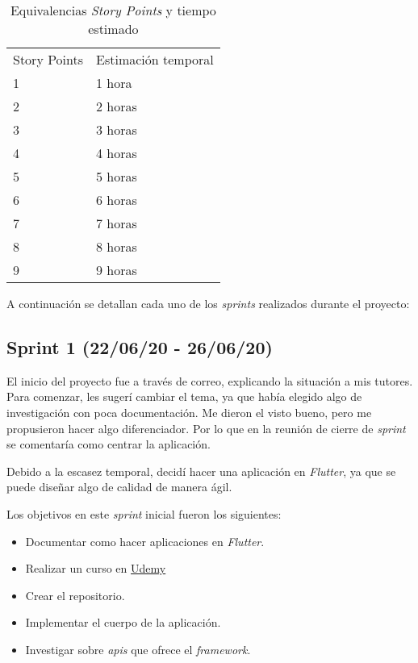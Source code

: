 \begin{table}[H]
	\centering
	\begin{tabular}{l l }
		\toprule
		{Story Points} & Estimación temporal \\
		1            & 1 hora              \\ 
		2            & 2 horas           \\ 
		3            & 3 horas             \\ 
		4            & 4 horas           \\ 
		5            & 5 horas             \\ 
		6            & 6 horas           \\ 
		7            & 7 horas             \\ 
		8            & 8 horas             \\ 
		9            & 9 horas             \\ \bottomrule
	\end{tabular}
	\caption{Equivalencias \emph{Story Points} y tiempo estimado}
	\label{tabla:storypoint}
\end{table}

A continuación se detallan cada uno de los \emph{sprints} realizados durante el proyecto:

\subsection{Sprint 1 (22/06/20 - 26/06/20)}\label{sprint-2-220620---260620}

El inicio del proyecto fue a través de correo, explicando la situación a mis tutores. Para comenzar, les sugerí cambiar el tema, ya que había elegido algo de investigación con poca documentación. Me dieron el visto bueno, pero me propusieron hacer algo diferenciador. Por lo que en la reunión de cierre de \emph{sprint} se comentaría como centrar la aplicación. 

Debido a la escasez temporal, decidí hacer una aplicación en \emph{Flutter}, ya que se puede diseñar algo de calidad de manera ágil.

Los objetivos en este \emph{sprint} inicial fueron los siguientes:

\begin{itemize}
\item Documentar como hacer aplicaciones en \emph{Flutter}.
\item Realizar un curso en \href{https://www.udemy.com/course/flutter-primeros-pasos/}{Udemy}
\item Crear el repositorio.
\item Implementar el cuerpo de la aplicación.
\item Investigar sobre \emph{apis} que ofrece el \emph{framework}.
\end{itemize}

